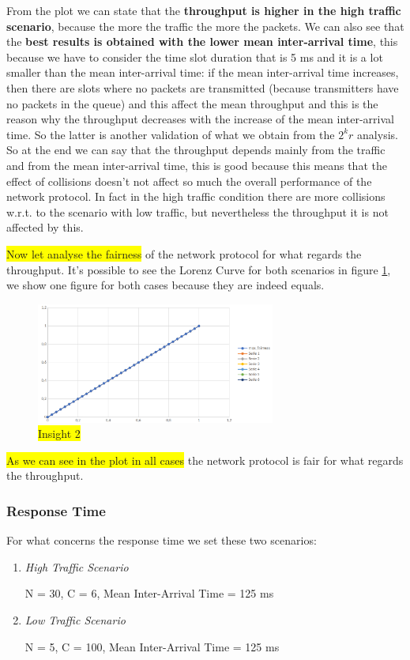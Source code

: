 \noindent From the plot we can state that the \textbf{throughput is higher in the high traffic scenario}, because the more the traffic the more the packets. We can also see that the \textbf{best results is obtained with the lower mean inter-arrival time}, this because we have to consider the time slot duration that is 5 ms and it is a lot smaller than the mean inter-arrival time: if the mean inter-arrival time increases, then there are slots where no packets are transmitted (because transmitters have no packets in the queue) and this affect the mean throughput and this is the reason why the throughput decreases with the increase of the mean inter-arrival time. So the latter is another validation of what we obtain from the $2^kr$ analysis. So at the end we can say that the throughput depends mainly from the traffic and from the mean inter-arrival time, this is good because this means that the effect of collisions doesn't not affect so much the overall performance of the network protocol. In fact in the high traffic condition there are more collisions w.r.t. to the scenario with low traffic, but nevertheless the throughput it is not affected by this.

\noindent \colorbox{yellow}{Now let analyse the fairness} of the network protocol for what regards the throughput. It's possible to see the Lorenz Curve for both scenarios in figure \ref{img: insight2_throughput}, we show one figure for both cases because they are indeed equals.

\begin{figure}[H]
	\centering
	\includegraphics[width=0.7\textwidth]{img/lorenz_throughput.png}
	\caption{\colorbox{yellow}{Insight 2}}
	\label{img: insight2_throughput}
\end{figure}

\noindent \colorbox{yellow}{As we can see in the plot in all cases} the network protocol is fair for what regards the throughput.

\subsubsection{Response Time}
For what concerns the response time we set these two scenarios:
\begin{enumerate}
	\item \textit{High Traffic Scenario}
	
	N = 30, C = 6, Mean Inter-Arrival Time = 125 ms
	\item \textit{Low Traffic Scenario}
	
	N = 5, C = 100, Mean Inter-Arrival Time = 125 ms
\end{enumerate}

